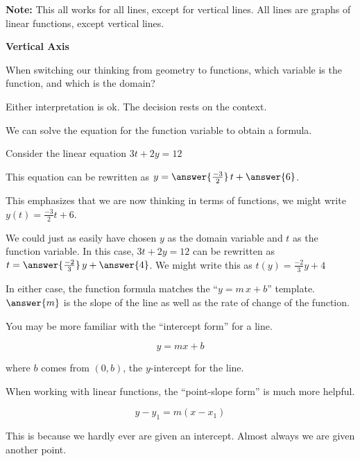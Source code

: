 \documentclass{ximera}
\begin{document}
\textbf{Note:} This all works for all lines, except for vertical lines. All lines are graphs of linear functions, except vertical lines. 



\begin{explanation} \textbf{\textcolor{red!75!green}{Vertical Axis}}


When switching our thinking from geometry to functions, which variable is the function, and which is the domain? 

Either interpretation is ok.  The decision rests on the context.  

We can solve the equation for the function variable to obtain a formula.



Consider the linear equation $3 t + 2 y = 12$ 

This equation can be rewritten as $y = \answer{\frac{-3}{2}} \, t + \answer{6}$.

This emphasizes that we are now thinking in terms of functions, we might write $y(t) = \tfrac{-3}{2} t + 6$.




We could just as easily have chosen $y$ as the domain variable and $t$ as the function variable.  In this case, $3 t + 2 y = 12$ can be rewritten as $t = \answer{\frac{-2}{3}} \, y + \answer{4}$.  We might write this as $t(y) = \tfrac{-2}{3} y + 4$




In either case, the function formula matches the ``$y = m \, x + b$'' template.  $\answer{m}$ is the slope of the line as well as the rate of change of the function.


\end{explanation}



You may be more familiar with the ``intercept form'' for a line.

\[ y = m x + b\]

where $b$ comes from $(0,b)$, the $y$-intercept for the line.


When working with linear functions, the ``point-slope form'' is much more helpful.

\[ y - y_1 = m (x - x_1)\]


This is because we hardly ever are given an intercept. Almost always we are given another point.
\end{document}
